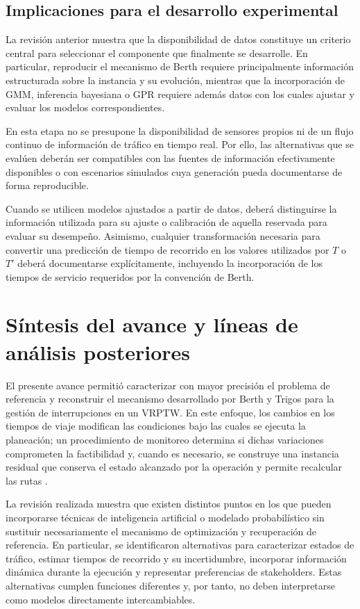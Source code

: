 \documentclass[11pt]{article}
\begin{document}
\subsection{Implicaciones para el desarrollo experimental}

La revisión anterior muestra que la disponibilidad de datos constituye un criterio
central para seleccionar el componente que finalmente se desarrolle. En particular,
reproducir el mecanismo de Berth requiere principalmente información estructurada
sobre la instancia y su evolución, mientras que la incorporación de GMM, inferencia
bayesiana o GPR requiere además datos con los cuales ajustar y evaluar los modelos
correspondientes.

En esta etapa no se presupone la disponibilidad de sensores propios ni de un flujo
continuo de información de tráfico en tiempo real. Por ello, las alternativas que se
evalúen deberán ser compatibles con las fuentes de información efectivamente
disponibles o con escenarios simulados cuya generación pueda documentarse de forma
reproducible.

Cuando se utilicen modelos ajustados a partir de datos, deberá distinguirse la
información utilizada para su ajuste o calibración de aquella reservada para evaluar
su desempeño. Asimismo, cualquier transformación necesaria para convertir una
predicción de tiempo de recorrido en los valores utilizados por \(T\) o \(T'\) deberá
documentarse explícitamente, incluyendo la incorporación de los tiempos de servicio
requeridos por la convención de Berth.

\section{Síntesis del avance y líneas de análisis posteriores}

El presente avance permitió caracterizar con mayor precisión el problema de referencia
y reconstruir el mecanismo desarrollado por Berth y Trigos para la gestión de
interrupciones en un VRPTW. En este enfoque, los cambios en los tiempos de viaje
modifican las condiciones bajo las cuales se ejecuta la planeación; un procedimiento de
monitoreo determina si dichas variaciones comprometen la factibilidad y, cuando es
necesario, se construye una instancia residual que conserva el estado alcanzado por la
operación y permite recalcular las rutas
\parencite{berth_thesis_2025,berth_trigos_2025}.

La revisión realizada muestra que existen distintos puntos en los que pueden incorporarse
técnicas de inteligencia artificial o modelado probabilístico sin sustituir necesariamente
el mecanismo de optimización y recuperación de referencia. En particular, se identificaron
alternativas para caracterizar estados de tráfico, estimar tiempos de recorrido y su
incertidumbre, incorporar información dinámica durante la ejecución y representar
preferencias de stakeholders. Estas alternativas cumplen funciones diferentes y, por
tanto, no deben interpretarse como modelos directamente intercambiables.
\end{document}

